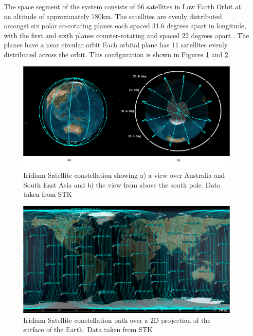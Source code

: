 The space segment of the system consists of 66 satellites in Low Earth Orbit at an altitude of approximately 780km. The satellites are evenly distributed amongst six polar co-rotating planes each spaced 31.6 degrees apart in longitude, with the first and sixth planes counter-rotating and spaced 22 degrees apart \cite{iridium_ICAO_man, iridium:an_overview1998}. The planes have a near circular orbit \cite{Pratt1999} Each orbital plane has 11 satellites evenly distributed across the orbit.  This configuration is shown in Figures \ref{fig:iridium_stk} and \ref{fig:iridium_2d_stk}.
\begin{figure}[H]
	\centering
	\includegraphics[scale = 0.35]{Pictures/iridium_stk.png}
	
	\caption{Iridium Satellite constellation showing a) a view over Australia and South East Asia and b) the view from above the south pole. Data taken from STK}
	\label{fig:iridium_stk}
\end{figure}
\begin{figure}[H]
	\centering
	\includegraphics[scale = 0.20]{Pictures/iridium_2d_stk.png}
	
	\caption{Iridium Satellite constellation path over a 2D projection of the surface of the Earth. Data taken from STK}
	\label{fig:iridium_2d_stk}
\end{figure}


